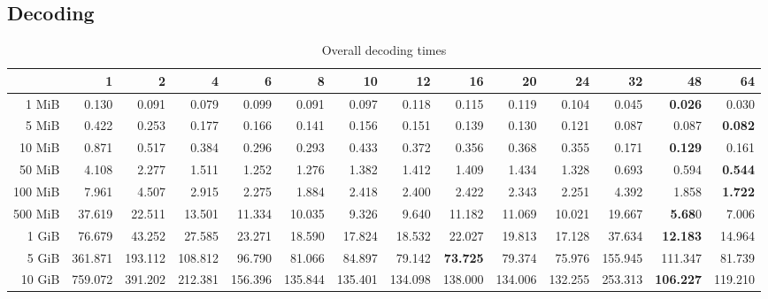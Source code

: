 \subsection{Decoding}
\begin{centering}
\begin{table}[!h]
	\caption{Overall decoding times}
	\begin{tabular}{rrrrrrrrrrrrrr}
		\toprule
		\diagbox[width=7em]{Size}{Threads} &      1  &      2  &      4  &      6  &      8  &      10 &      12 &      16 &      20 &      24 &      32 &      48 &      64 \\
		\midrule
		1 MiB   &   0.130 &   0.091 &   0.079 &   0.099 &   0.091 &   0.097 &   0.118 &   0.115 &   0.119 &   0.104 &   0.045 &   \textbf{0.026} &   0.030 \\
		5 MiB   &   0.422 &   0.253 &   0.177 &   0.166 &   0.141 &   0.156 &   0.151 &   0.139 &   0.130 &   0.121 &   0.087 &   0.087 &   \textbf{0.082} \\
		10 MiB  &   0.871 &   0.517 &   0.384 &   0.296 &   0.293 &   0.433 &   0.372 &   0.356 &   0.368 &   0.355 &   0.171 &   \textbf{0.129} &   0.161 \\
		50 MiB  &   4.108 &   2.277 &   1.511 &   1.252 &   1.276 &   1.382 &   1.412 &   1.409 &   1.434 &   1.328 &   0.693 &   0.594 &   \textbf{0.544} \\
		100 MiB &   7.961 &   4.507 &   2.915 &   2.275 &   1.884 &   2.418 &   2.400 &   2.422 &   2.343 &   2.251 &   4.392 &   1.858 &   \textbf{1.722} \\
		500 MiB &  37.619 &  22.511 &  13.501 &  11.334 &  10.035 &   9.326 &   9.640 &  11.182 &  11.069 &  10.021 &  19.667 &   \textbf{5.68}0 &   7.006 \\
		1 GiB   &  76.679 &  43.252 &  27.585 &  23.271 &  18.590 &  17.824 &  18.532 &  22.027 &  19.813 &  17.128 &  37.634 &  \textbf{12.183} &  14.964 \\
		5 GiB   & 361.871 & 193.112 & 108.812 &  96.790 &  81.066 &  84.897 &  79.142 &  \textbf{73.725} &  79.374 &  75.976 & 155.945 & 111.347 &  81.739 \\
		10 GiB  & 759.072 & 391.202 & 212.381 & 156.396 & 135.844 & 135.401 & 134.098 & 138.000 & 134.006 & 132.255 & 253.313 & \textbf{106.227} & 119.210 \\
		\bottomrule
	\end{tabular}
\end{table}


\end{centering}
